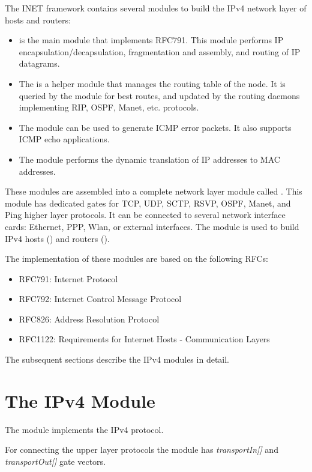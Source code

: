 The INET framework contains several modules to build the
IPv4 network layer of hosts and routers:
\begin{itemize}
  \item {} is the main module that implements RFC791. This
        module performs IP encapsulation/decapsulation, fragmentation
        and assembly, and routing of IP datagrams.
  \item The  is a helper module that manages the routing
        table of the node. It is queried by the  module
        for best routes, and updated by the routing daemons implementing
        RIP, OSPF, Manet, etc. protocols.
  \item The  module can be used to generate ICMP error packets. It also
        supports ICMP echo applications.
  \item The  module performs the dynamic translation of IP addresses
        to MAC addresses. 
\end{itemize}

These modules are assembled into a complete network layer module
called . This module has
dedicated gates for TCP, UDP, SCTP, RSVP, OSPF, Manet, and Ping
higher layer protocols. It can be connected to several network
interface cards: Ethernet, PPP, Wlan, or external interfaces.
The  module is used to build IPv4 hosts
() and routers ().

The implementation of these modules are based on the following RFCs:
\begin{itemize}
  \item RFC791: Internet Protocol
  \item RFC792: Internet Control Message Protocol
  \item RFC826: Address Resolution Protocol
  \item RFC1122: Requirements for Internet Hosts - Communication Layers
\end{itemize}

The subsequent sections describe the IPv4 modules in detail.

\section{The IPv4 Module}

The  module implements the IPv4 protocol.

For connecting the upper layer protocols the  module
has \emph{transportIn[]} and \emph{transportOut[]} gate vectors.

